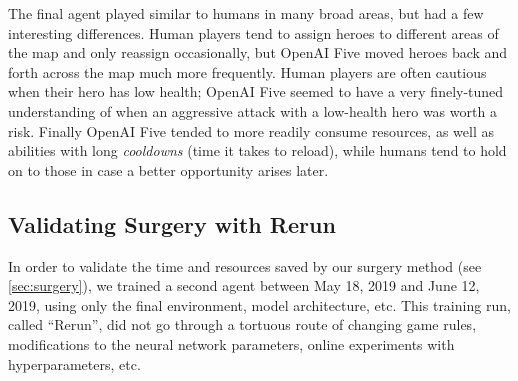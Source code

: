 \documentclass[11pt]{article}
\newcommand{\cleanexpname}{Rerun\xspace}
\newcommand{\openaifive}{OpenAI Five\xspace}
\begin{document}
The final agent played similar to humans in many broad areas, but had a few interesting differences.
Human players tend to assign heroes to different areas of the map and only reassign occasionally, but \openaifive moved heroes back and forth across the map much more frequently.
    Human players are often cautious when their hero has low health; \openaifive seemed to have a very finely-tuned understanding of when an aggressive attack with a low-health hero was worth a risk.
Finally \openaifive tended to more readily consume resources, as well as abilities with long {\it cooldowns} (time it takes to reload), while humans tend to hold on to those in case a better opportunity arises later. 


\subsection{Validating Surgery with \cleanexpname}\label{sec:rerun}
In order to validate the time and resources saved by our surgery method (see \autoref{sec:surgery}), we trained a second agent between May 18, 2019 and June 12, 2019, using only the final environment, model architecture, etc. 
This training run, called ``\cleanexpname'', did not go through a tortuous route of changing game rules, modifications to the neural network parameters, online experiments with hyperparameters, etc.
\end{document}
